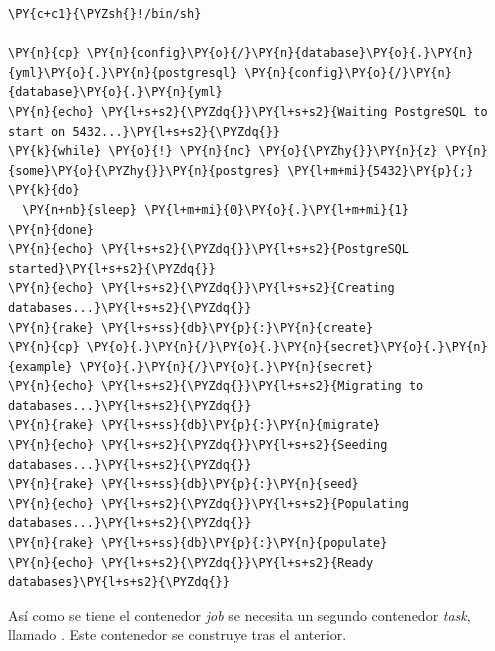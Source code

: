 \begin{codelisting}
\label{code:dockerfile}
\begin{Verbatim}[fontsize=\relsize{-2.5},fontseries=b,commandchars=\\\{\}]
\PY{c+c1}{\PYZsh{}!/bin/sh}

\PY{n}{cp} \PY{n}{config}\PY{o}{/}\PY{n}{database}\PY{o}{.}\PY{n}{yml}\PY{o}{.}\PY{n}{postgresql} \PY{n}{config}\PY{o}{/}\PY{n}{database}\PY{o}{.}\PY{n}{yml}
\PY{n}{echo} \PY{l+s+s2}{\PYZdq{}}\PY{l+s+s2}{Waiting PostgreSQL to start on 5432...}\PY{l+s+s2}{\PYZdq{}}
\PY{k}{while} \PY{o}{!} \PY{n}{nc} \PY{o}{\PYZhy{}}\PY{n}{z} \PY{n}{some}\PY{o}{\PYZhy{}}\PY{n}{postgres} \PY{l+m+mi}{5432}\PY{p}{;} \PY{k}{do}
  \PY{n+nb}{sleep} \PY{l+m+mi}{0}\PY{o}{.}\PY{l+m+mi}{1}
\PY{n}{done}
\PY{n}{echo} \PY{l+s+s2}{\PYZdq{}}\PY{l+s+s2}{PostgreSQL started}\PY{l+s+s2}{\PYZdq{}}
\PY{n}{echo} \PY{l+s+s2}{\PYZdq{}}\PY{l+s+s2}{Creating databases...}\PY{l+s+s2}{\PYZdq{}}
\PY{n}{rake} \PY{l+s+ss}{db}\PY{p}{:}\PY{n}{create}
\PY{n}{cp} \PY{o}{.}\PY{n}{/}\PY{o}{.}\PY{n}{secret}\PY{o}{.}\PY{n}{example} \PY{o}{.}\PY{n}{/}\PY{o}{.}\PY{n}{secret}
\PY{n}{echo} \PY{l+s+s2}{\PYZdq{}}\PY{l+s+s2}{Migrating to databases...}\PY{l+s+s2}{\PYZdq{}}
\PY{n}{rake} \PY{l+s+ss}{db}\PY{p}{:}\PY{n}{migrate}
\PY{n}{echo} \PY{l+s+s2}{\PYZdq{}}\PY{l+s+s2}{Seeding databases...}\PY{l+s+s2}{\PYZdq{}}
\PY{n}{rake} \PY{l+s+ss}{db}\PY{p}{:}\PY{n}{seed}
\PY{n}{echo} \PY{l+s+s2}{\PYZdq{}}\PY{l+s+s2}{Populating databases...}\PY{l+s+s2}{\PYZdq{}}
\PY{n}{rake} \PY{l+s+ss}{db}\PY{p}{:}\PY{n}{populate}
\PY{n}{echo} \PY{l+s+s2}{\PYZdq{}}\PY{l+s+s2}{Ready databases}\PY{l+s+s2}{\PYZdq{}}
\end{Verbatim}
\end{codelisting}

Así como se tiene el contenedor \textit{job} se necesita un segundo contenedor \textit{task}, llamado . Este contenedor se construye tras el anterior.

